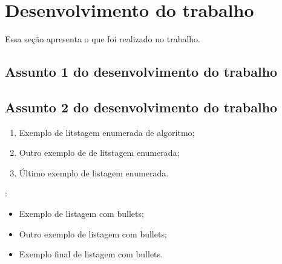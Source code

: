 \chapter{Desenvolvimento do trabalho}\label{cap:desenvolvimento_trabalho}
Essa seção apresenta o que foi realizado no trabalho.

\lipsum[22]

\section{Assunto 1 do desenvolvimento do trabalho}
\lipsum[23-27]

\section{Assunto 2 do desenvolvimento do trabalho}

\lipsum[23-27]

\begin{enumerate}
    \item Exemplo de litstagem enumerada de algoritmo;
    \item Outro exemplo de de litstagem enumerada;
    \item Último exemplo de listagem enumerada.
\end{enumerate}

\lipsum[28]:

\begin{itemize}
    \item Exemplo de listagem com bullets;
    \item Outro exemplo de listagem com bullets; 
    \item Exemplo final de listagem com bullets. 
\end{itemize}
